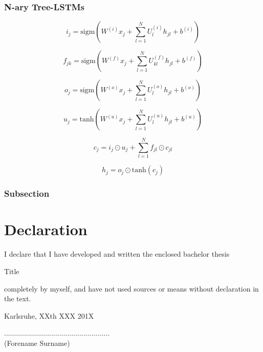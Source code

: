\documentclass[a4paper,12pt]{article}%
\begin{document}
\subsubsection{N-ary Tree-LSTMs}

$$
i_j = \text{sigm} \left( W^{(i)} x_j + \sum_{l=1}^N U_l^{(i)} h_{jl} + b^{(i)} \right) 
$$

$$
f_{jk} = \text{sigm} \left( W^{(f)} x_j + \sum_{l=1}^N U_{kl}^{(f)} h_{jl} + b^{(f)} \right) 
$$

$$
o_j = \text{sigm} \left( W^{(o)} x_j + \sum_{l=1}^N U_{l}^{(o)} h_{jl} + b^{(o)} \right) 
$$

$$
u_j = \text{tanh} \left( W^{(u)} x_j +\sum_{l=1}^N U_{l}^{(u)} h_{jl} + b^{(u)} \right)
$$

$$
c_j = i_j \odot u_j + \sum_{l=1}^N f_{jl} \odot c_{jl}
$$

$$
h_j = o_j \odot \text{tanh}(c_j)
$$

\subsubsection{Subsection}

\newpage
\section*{Declaration}

\vspace{2cm}
\begin{flushleft}
    I declare that I have developed and written the enclosed
    bachelor thesis\\[-0.3cm]
\end{flushleft}
\begin{center}
    {\large Title}\\[0.5cm]
\end{center}
    completely by myself, and have not used sources or means without
    declaration in the text.\\[2.5cm]

\begin{flushleft}
    Karlsruhe, XXth XXX 201X\\[0.1cm]
\end{flushleft}
\hspace*{9.0cm}.....................................................\\
\hspace*{10.1cm}(Forename Surname)
\end{document}
